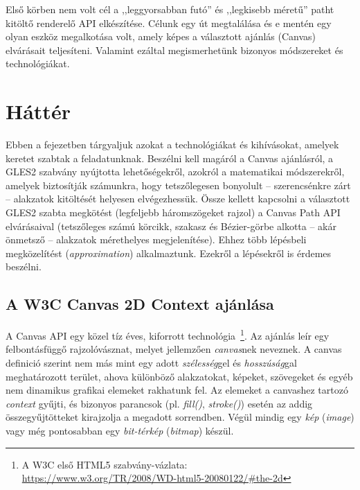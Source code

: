 \documentclass[12pt]{report}
\theoremstyle{definition}
\newcommand{\inenglish}[1]{\textsl{#1}}
\begin{document}
  Első körben nem volt cél a ,,leggyorsabban futó'' és ,,legkisebb
méretű'' patht kitöltő renderelő API elkészítése. Célunk egy út
megtalálása és e mentén egy olyan eszköz megalkotása volt, amely képes
a választott ajánlás (Canvas) elvárásait teljesíteni. Valamint ezáltal
megismerhetünk bizonyos módszereket és technológiákat.



    \chapter{Háttér}
    \label{Háttér}

  Ebben a fejezetben tárgyaljuk azokat a technológiákat és kihívásokat,
amelyek keretet szabtak a feladatunknak. Beszélni kell magáról a Canvas
ajánlásról, a GLES2 szabvány nyújtotta lehetőségekről, azokról a
matematikai módszerekről, amelyek biztosítják számunkra, hogy
tetszőlegesen bonyolult -- szerencsénkre zárt -- alakzatok kitöltését
helyesen elvégezhessük. Össze kellett kapcsolni a választott GLES2
szabta megkötést (legfeljebb háromszögeket rajzol) a Canvas Path API
elvárásaival (tetszőleges számú körcikk, szakasz és Bézier-görbe
alkotta -- akár önmetsző -- alakzatok mérethelyes megjelenítése). Ehhez
több lépésbeli megközelítést (\inenglish{approximation}) alkalmaztunk.
Ezekről a lépésekről is érdemes beszélni.

    \section[A Canvas ajánlás]{A W3C Canvas 2D Context ajánlása}
    \label{A Canvas ajánlás}

  A Canvas API egy közel tíz éves, kiforrott technológia~\footnote{A W3C
első HTML5 szabvány-vázlata:\\ \footnotesize{
\url{https://www.w3.org/TR/2008/WD-html5-20080122/\#the-2d}}}. Az
ajánlás leír egy felbontásfüggő rajzolóvásznat, melyet jellemzően
\emph{canvas}nek neveznek. A canvas definició szerint nem más mint egy
adott \emph{szélesség}gel és \emph{hosszúság}gal meghatározott terület,
ahova különböző alakzatokat, képeket, szövegeket és egyéb nem dinamikus
grafikai elemeket rakhatunk fel. Az elemeket a canvashez tartozó
\emph{context} gyűjti, és bizonyos parancsok (pl. \emph{fill()},
\emph{stroke()}) esetén az addig összegyűjtötteket kirajzolja a
megadott sorrendben. Végül mindig egy \emph{kép} (\inenglish{image})
vagy még pontosabban egy \emph{bit-térkép} (\inenglish{bitmap}) készül.
\end{document}
